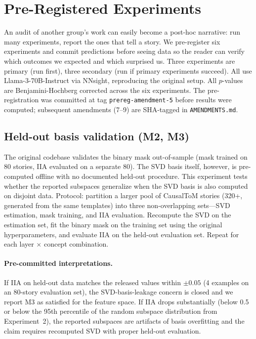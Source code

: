 \documentclass{article}
\begin{document}
\section{Pre-Registered Experiments}
\label{sec:experiments}

An audit of another group's work can easily become a post-hoc narrative: run many experiments, report the ones that tell a story. We pre-register six experiments and commit predictions before seeing data so the reader can verify which outcomes we expected and which surprised us. Three experiments are primary (run first), three secondary (run if primary experiments succeed). All use Llama-3-70B-Instruct via NNsight, reproducing the original setup. All $p$-values are Benjamini-Hochberg corrected across the six experiments. The pre-registration was committed at tag \texttt{prereg-amendment-5} before results were computed; subsequent amendments (7--9) are SHA-tagged in \texttt{AMENDMENTS.md}.

\subsection{Held-out basis validation (M2, M3)}

The original codebase validates the binary mask out-of-sample (mask trained on 80 stories, IIA evaluated on a separate 80). The SVD basis itself, however, is pre-computed offline with no documented held-out procedure. This experiment tests whether the reported subspaces generalize when the SVD basis is also computed on disjoint data. Protocol: partition a larger pool of CausalToM stories (320+, generated from the same templates) into three non-overlapping sets---SVD estimation, mask training, and IIA evaluation. Recompute the SVD on the estimation set, fit the binary mask on the training set using the original hyperparameters, and evaluate IIA on the held-out evaluation set. Repeat for each layer $\times$ concept combination.

\paragraph{Pre-committed interpretations.} If IIA on held-out data matches the released values within $\pm 0.05$ (4 examples on an 80-story evaluation set), the SVD-basis-leakage concern is closed and we report M3 as satisfied for the feature space. If IIA drops substantially (below 0.5 or below the 95th percentile of the random subspace distribution from Experiment~2), the reported subspaces are artifacts of basis overfitting and the claim requires recomputed SVD with proper held-out evaluation.
\end{document}
